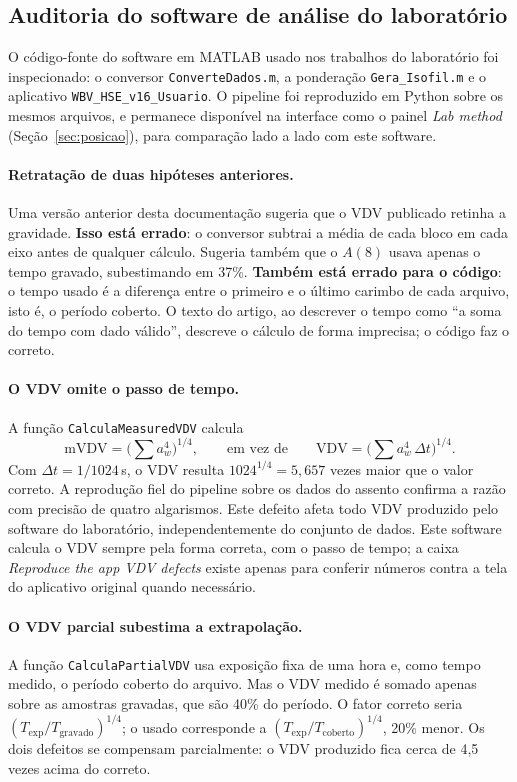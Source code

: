 \documentclass[11pt,a4paper]{article}
\newcommand{\code}[1]{\texttt{\small #1}}
\begin{document}
\subsection{Auditoria do software de análise do laboratório}
\label{sec:auditoria}

O código-fonte do software em MATLAB usado nos trabalhos do laboratório foi
inspecionado: o conversor \code{ConverteDados.m}, a ponderação
\code{Gera\_Isofil.m} e o aplicativo \code{WBV\_HSE\_v16\_Usuario}. O pipeline foi
reproduzido em Python sobre os mesmos arquivos, e permanece disponível na
interface como o painel \emph{Lab method} (Seção~\ref{sec:posicao}), para
comparação lado a lado com este software.

\paragraph{Retratação de duas hipóteses anteriores.} Uma versão anterior desta
documentação sugeria que o VDV publicado retinha a gravidade. \textbf{Isso está
errado}: o conversor subtrai a média de cada bloco em cada eixo antes de
qualquer cálculo. Sugeria também que o $A(8)$ usava apenas o tempo gravado,
subestimando em 37\%. \textbf{Também está errado para o código}: o tempo usado é
a diferença entre o primeiro e o último carimbo de cada arquivo, isto é, o
período coberto. O texto do artigo, ao descrever o tempo como ``a soma do tempo
com dado válido'', descreve o cálculo de forma imprecisa; o código faz o
correto.

\paragraph{O VDV omite o passo de tempo.} A função \code{CalculaMeasuredVDV}
calcula
\[
\mathrm{mVDV} = \Big(\sum a_w^4\Big)^{1/4},
\qquad\text{em vez de}\qquad
\mathrm{VDV} = \Big(\sum a_w^4\,\Delta t\Big)^{1/4}.
\]
Com $\Delta t = 1/1024$\,s, o VDV resulta $1024^{1/4} = 5{,}657$ vezes maior que
o valor correto. A reprodução fiel do pipeline sobre os dados do assento
confirma a razão com precisão de quatro algarismos. Este defeito afeta todo VDV
produzido pelo software do laboratório, independentemente do conjunto de dados.
Este software calcula o VDV sempre pela forma correta, com o passo de tempo; a
caixa \emph{Reproduce the app VDV defects} existe apenas para conferir números
contra a tela do aplicativo original quando necessário.

\paragraph{O VDV parcial subestima a extrapolação.} A função
\code{CalculaPartialVDV} usa exposição fixa de uma hora e, como tempo medido, o
período coberto do arquivo. Mas o VDV medido é somado apenas sobre as amostras
gravadas, que são 40\% do período. O fator correto seria
$(T_{\mathrm{exp}}/T_{\mathrm{gravado}})^{1/4}$; o usado corresponde a
$(T_{\mathrm{exp}}/T_{\mathrm{coberto}})^{1/4}$, 20\% menor. Os dois defeitos se
compensam parcialmente: o VDV produzido fica cerca de 4,5 vezes acima do
correto.
\end{document}
